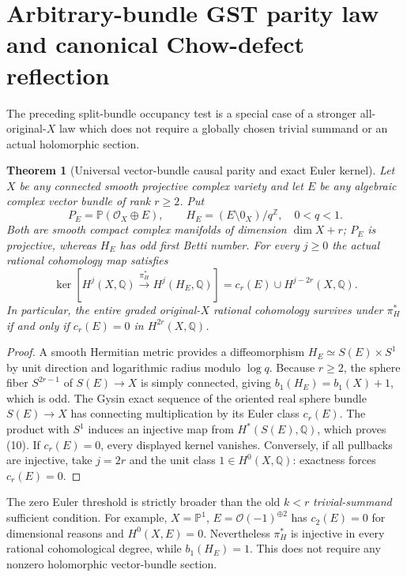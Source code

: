 \documentclass[11pt]{article}
\newtheorem{theorem}{Theorem}
\begin{document}
\section{Arbitrary-bundle GST parity law and canonical Chow-defect reflection}

The preceding split-bundle occupancy test is a special case of a stronger
all-original-$X$ law which does not require a globally chosen trivial
summand or an actual holomorphic section.

\begin{theorem}[Universal vector-bundle causal parity and exact Euler kernel]
Let $X$ be any connected smooth projective complex variety and let
$E$ be \emph{any} algebraic complex vector bundle of rank $r\geq2$.
Put
\[
  P_E=\mathbb P(\mathcal O_X\oplus E),\qquad
  H_E=(E\setminus0_X)/q^{\mathbb Z},\quad 0<q<1.
\]
Both are smooth compact complex manifolds of dimension $\dim X+r$;
$P_E$ is projective, whereas $H_E$ has odd first Betti number. For
every $j\geq0$ the actual rational cohomology map satisfies
\[
 \boxed{\ker[H^j(X,\mathbb Q)\xrightarrow{\pi_H^*}
              H^j(H_E,\mathbb Q)]
      = c_r(E)\cup H^{j-2r}(X,\mathbb Q).}                    \tag{10}
\]
In particular, \emph{the entire graded original-$X$ rational
cohomology survives} under $\pi_H^*$ if and only if
$c_r(E)=0$ in $H^{2r}(X,\mathbb Q)$.
\end{theorem}
\begin{proof}
A smooth Hermitian metric provides a diffeomorphism
$H_E\simeq S(E)\times S^1$ by unit direction and logarithmic radius
modulo $\log q$. Because $r\ge2$, the sphere fiber $S^{2r-1}$
of $S(E)\to X$ is simply connected, giving
$b_1(H_E)=b_1(X)+1$, which is odd.
The Gysin exact sequence of the oriented real sphere bundle
$S(E)\to X$ has connecting multiplication by its Euler class
$c_r(E)$. The product with $S^1$ induces an injective map from
$H^*(S(E),\mathbb Q)$, which proves (10).
If $c_r(E)=0$, every displayed kernel vanishes. Conversely, if all
pullbacks are injective, take $j=2r$ and the unit class
$1\in H^0(X,\mathbb Q)$: exactness forces $c_r(E)=0$.
\end{proof}

The zero Euler threshold is strictly broader than the old
$k<r$ \emph{trivial-summand} sufficient condition. For example,
$X=\mathbb P^1$, $E=\mathcal O(-1)^{\oplus2}$ has
$c_2(E)=0$ for dimensional reasons and $H^0(X,E)=0$.
Nevertheless $\pi_H^*$ is injective in every rational cohomological
degree, while $b_1(H_E)=1$. This does not require any nonzero
holomorphic vector-bundle section.
\end{document}
